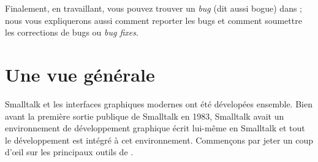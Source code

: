 \documentclass[a4paper,10pt,twoside]{book}
\begin{document}
Finalement, en travaillant, vous pouvez trouver un \emph{bug} (dit aussi bogue) dans \pharo;
nous vous expliquerons aussi comment reporter les bugs
et comment soumettre les corrections de bugs ou \emph{bug fixes}.

\section{Une vue générale}

Smalltalk et les interfaces graphiques modernes ont été dévelopées ensemble.
Bien avant la première sortie publique de Smalltalk en 1983, Smalltalk
avait un environnement de développement graphique écrit lui-même en Smalltalk et
tout le développement est intégré à cet environnement.
Commençons par jeter un coup d'\oe il sur les principaux outils de
\pharo. %
\end{document}
